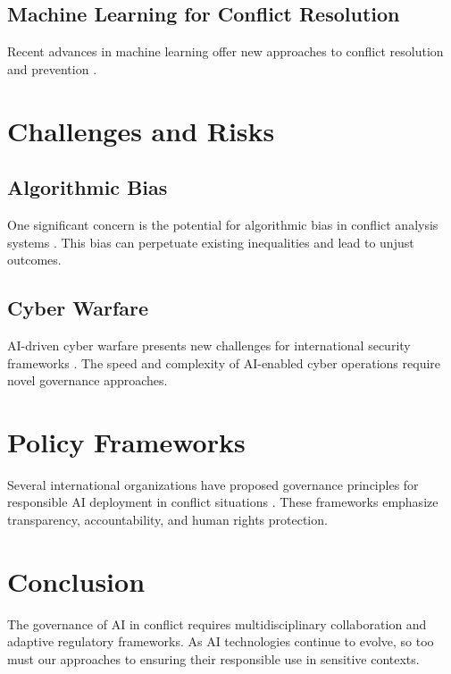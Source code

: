 \documentclass[12pt,a4paper]{article}
\begin{document}
\subsection{Machine Learning for Conflict Resolution}

Recent advances in machine learning offer new approaches to conflict resolution and prevention \cite{conflict_resolution_ai_2024, humanitarian_ai_2023}.

\section{Challenges and Risks}

\subsection{Algorithmic Bias}

One significant concern is the potential for algorithmic bias in conflict analysis systems \cite{algorithmic_bias_conflict_2023}. This bias can perpetuate existing inequalities and lead to unjust outcomes.

\subsection{Cyber Warfare}

AI-driven cyber warfare presents new challenges for international security frameworks \cite{cyber_warfare_ai_2024}. The speed and complexity of AI-enabled cyber operations require novel governance approaches.

\section{Policy Frameworks}

Several international organizations have proposed governance principles for responsible AI deployment in conflict situations \cite{ai_governance_principles_2023}. These frameworks emphasize transparency, accountability, and human rights protection.

\section{Conclusion}

The governance of AI in conflict requires multidisciplinary collaboration and adaptive regulatory frameworks. As AI technologies continue to evolve, so too must our approaches to ensuring their responsible use in sensitive contexts.



\end{document}
